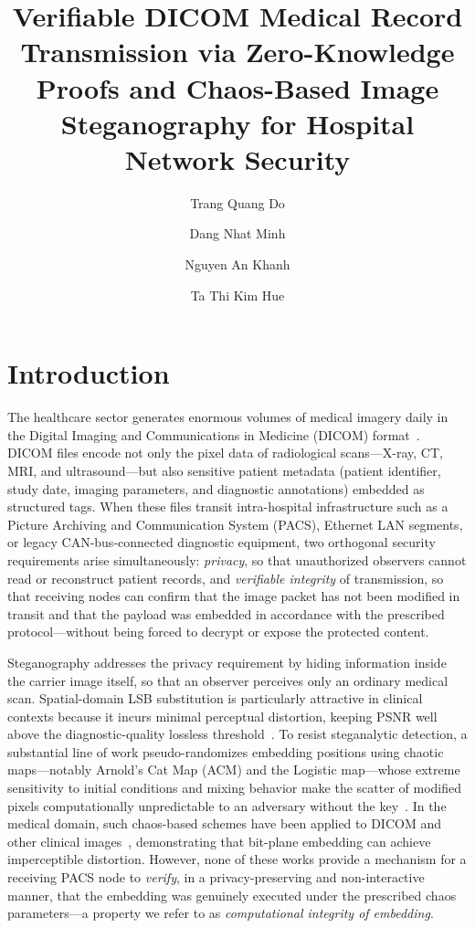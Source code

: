 \documentclass{jstarticle}
\title{Verifiable DICOM Medical Record Transmission via Zero-Knowledge Proofs
and Chaos-Based Image Steganography for Hospital Network Security}
\author[1]{Trang Quang Do}
\author[1]{Dang Nhat Minh}
\author[1]{Nguyen An Khanh}
\author[1,*]{Ta Thi Kim Hue}
\begin{document}
\maketitle

\section{Introduction}

The healthcare sector generates enormous volumes of medical imagery daily in the Digital Imaging and Communications in Medicine (DICOM) format~\cite{b14}.
DICOM files encode not only the pixel data of radiological scans---X-ray, CT, MRI, and ultrasound---but also sensitive patient metadata (patient identifier, study date, imaging parameters, and diagnostic annotations) embedded as structured tags.
When these files transit intra-hospital infrastructure such as a Picture Archiving and Communication System (PACS), Ethernet LAN segments, or legacy CAN-bus-connected diagnostic equipment, two orthogonal security requirements arise simultaneously: \emph{privacy}, so that unauthorized observers cannot read or reconstruct patient records, and \emph{verifiable integrity} of transmission, so that receiving nodes can confirm that the image packet has not been modified in transit and that the payload was embedded in accordance with the prescribed protocol---without being forced to decrypt or expose the protected content.

Steganography addresses the privacy requirement by hiding information inside the carrier image itself, so that an observer perceives only an ordinary medical scan.
Spatial-domain LSB substitution is particularly attractive in clinical contexts because it incurs minimal perceptual distortion, keeping PSNR well above the diagnostic-quality lossless threshold~\cite{b15}.
To resist steganalytic detection, a substantial line of work pseudo-randomizes embedding positions using chaotic maps---notably Arnold's Cat Map (ACM) and the Logistic map---whose extreme sensitivity to initial conditions and mixing behavior make the scatter of modified pixels computationally unpredictable to an adversary without the key~\cite{b3,b4,b5}.
In the medical domain, such chaos-based schemes have been applied to DICOM and other clinical images~\cite{b4}, demonstrating that bit-plane embedding can achieve imperceptible distortion.
However, none of these works provide a mechanism for a receiving PACS node to \emph{verify}, in a privacy-preserving and non-interactive manner, that the embedding was genuinely executed under the prescribed chaos parameters---a property we refer to as \emph{computational integrity of embedding}.
\end{document}
